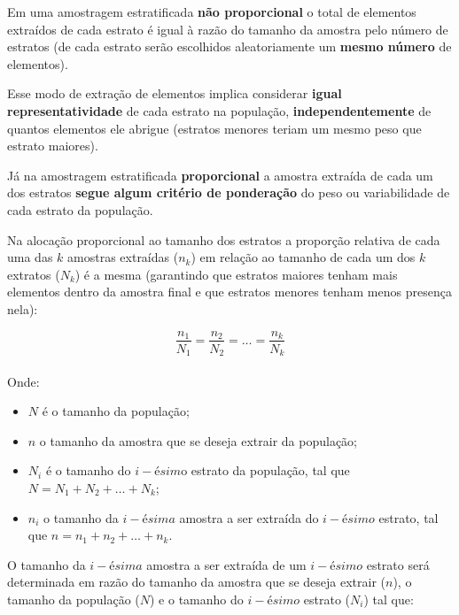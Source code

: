 \documentclass[
]{book}
\providecommand{\tightlist}{%
  \setlength{\itemsep}{0pt}\setlength{\parskip}{0pt}}
\begin{document}
Em uma amostragem estratificada \textbf{não proporcional} o total de elementos extraídos de cada estrato é igual à razão do tamanho da amostra pelo número de estratos (de cada estrato serão escolhidos aleatoriamente um \textbf{mesmo número} de elementos).

\hfill\break

Esse modo de extração de elementos implica considerar \textbf{igual representatividade} de cada estrato na população, \textbf{independentemente} de quantos elementos ele abrigue (estratos menores teriam um mesmo peso que estrato maiores).

\hfill\break

Já na amostragem estratificada \textbf{proporcional} a amostra extraída de cada um dos estratos \textbf{segue algum critério de ponderação} do peso ou variabilidade de cada estrato da população.

\hfill\break

Na alocação proporcional ao tamanho dos estratos a proporção relativa de cada uma das \(k\) amostras extraídas (\(n_{k}\)) em relação ao tamanho de cada um dos \(k\) extratos (\(N_{k}\)) é a mesma (garantindo que estratos maiores tenham mais elementos dentro da amostra final e que estratos menores tenham menos presença nela):

\hfill\break

\[
\frac{n_{1}}{N_{1}} = \frac{n_{2}}{N_{2}} = \dots = \frac{n_{k}}{N_{k}}
\]\\

Onde:

\hfill\break

\begin{itemize}
\tightlist
\item
  \(N\) é o tamanho da população;\\
\item
  \(n\) o tamanho da amostra que se deseja extrair da população;\\
\item
  \(N_{i}\) é o tamanho do \(i-ésim\)o estrato da população, tal que \(N=N_{1}+N_{2}+\dots+N_{k}\);\\
\item
  \(n_{i}\) o tamanho da \(i-ésima\) amostra a ser extraída do \(i-ésimo\) estrato, tal que \(n = n_{1} + n_{2} + \dots + n_{k}\).
\end{itemize}

\hfill\break

O tamanho da \(i-ésima\) amostra a ser extraída de um \(i-ésimo\) estrato será determinada em razão do tamanho da amostra que se deseja extrair (\(n\)), o tamanho da população (\(N\)) e o tamanho do \(i-ésimo\) estrato (\(N_{i}\)) tal que:
\end{document}
